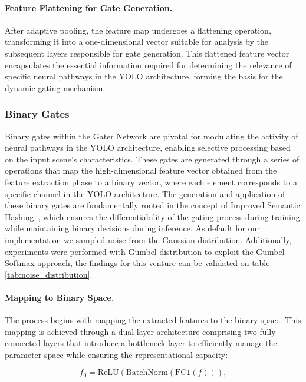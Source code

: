 \paragraph{Feature Flattening for Gate Generation.} After adaptive pooling, the feature map undergoes a flattening operation, transforming it into a one-dimensional vector suitable for analysis by the subsequent layers responsible for gate generation. This flattened feature vector encapsulates the essential information required for determining the relevance of specific neural pathways in the YOLO architecture, forming the basis for the dynamic gating mechanism.

\subsubsection{Binary Gates}
Binary gates within the Gater Network are pivotal for modulating the activity of neural pathways in the YOLO architecture, enabling selective processing based on the input scene's characteristics. These gates are generated through a series of operations that map the high-dimensional feature vector obtained from the feature extraction phase to a binary vector, where each element corresponds to a specific channel in the YOLO architecture. The generation and application of these binary gates are fundamentally rooted in the concept of Improved Semantic Hashing~\cite{kaiser2018discrete,chen2019you}, which ensures the differentiability of the gating process during training while maintaining binary decisions during inference. As default for our implementation we sampled noise from the Gaussian distribution. Additionally, experiments were performed with Gumbel distribution to exploit the Gumbel-Softmax approach, the findings for this venture can be validated on table \ref{tab:noise_distribution}.

\paragraph{Mapping to Binary Space.} The process begins with mapping the extracted features to the binary space. This mapping is achieved through a dual-layer architecture comprising two fully connected layers that introduce a bottleneck layer to efficiently manage the parameter space while ensuring the representational capacity:

\begin{equation}
f_0 = \text{ReLU}(\text{BatchNorm}(\text{FC1}(f))),
\label{eq:bottleneck_mapping}
\end{equation}

